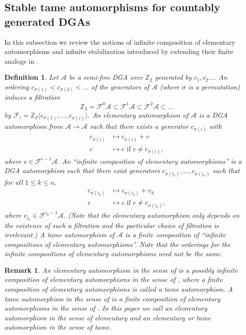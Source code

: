 \documentclass[11pt]{amsart}
\theoremstyle{mystyle}
\newtheorem{definition}{Definition}[section]
\newtheorem{remark}[remark]{Remark}
\newcommand{\Z}{\mathbb{Z}}
\newcommand{\<}{\langle}
\renewcommand{\>}{\rangle}
\begin{document}
\subsection{Stable tame automorphisms for countably generated DGAs}

In this subsection we review the notions of infinite composition of elementary automorphisms and infinite stabilization introduced by \cite[Sec. 2.6]{ekholmNg2015weinstein} extending their finite analogs in \cite[Sec. 2]{chekanov2002dga}.

\begin{definition}
    Let $\mathcal{A}$ be a semi-free DGA over $\Z_2$ generated by $c_1, c_2 \dots$. An ordering $c_{\sigma(1)} < c_{\sigma(2)} < \dots$ of the generators of $\mathcal{A}$ (where $\sigma$ is a permutation) induces a filtration \[\Z_2 = \mathcal{F}^0 \mathcal{A} \subset \mathcal{F}^1 \mathcal{A} \subset \mathcal{F}^2 \mathcal{A} \subset \dots \] by $\mathcal{F}_i = \Z_2\langle c_{\sigma(1)}, \dots, c_{\sigma(i)} \rangle$. An \textit{elementary} automorphism of $\mathcal{A}$ is a DGA automorphism from $\mathcal{A} \rightarrow \mathcal{A}$ such that there exists a generator $c_{\sigma(i)}$ with \begin{align*}
        c_{\sigma(i)} &\mapsto c_{\sigma(i)} + v \\
        c &\mapsto c \text{ if } c \neq c_{\sigma(i)},
    \end{align*} where $v \in \mathcal{F}^{i-1} \mathcal{A}$. An ``infinite composition of elementary automorphisms'' is a DGA automorphism such that there exist generators $c_{\sigma(i_1)}, \dots, c_{\sigma(i_n)}$ such that for all $1 \leq k \leq n$, \begin{align*}
        c_{\sigma(i_k)} &\mapsto c_{\sigma(i_k)} + v_k \\
        c &\mapsto c \text{ if } c \neq c_{\sigma(i_k)},
    \end{align*} where $v_{i_k} \in \mathcal{F}^{i_k-1} \mathcal{A}$. (Note that the elementary automorphism only depends on the existence of such a filtration and the particular choice of filtration is irrelevant.) A \textit{tame} automorphism of $\mathcal{A}$ is a finite composition of ``infinite compositions of elementary automorphisms''. Note that the orderings for the infinite compositions of elementary automorphisms need not be the same.
\end{definition}

\begin{remark}
    An elementary automorphism in the sense of \cite{ekholmNg2015weinstein} is a possibly infinite composition of elementary automorphisms in the sense of \cite{chekanov2002dga}, where a finite composition of elementary automorphisms is called a tame automorphism. A tame automorphism in the sense of \cite{ekholmNg2015weinstein} is a finite composition of elementary automorphisms in the sense of \cite{ekholmNg2015weinstein}. In this paper we call an elementary automorphism in the sense of \cite{chekanov2002dga} elementary and an elementary or tame automorphism in the sense of \cite{ekholmNg2015weinstein} tame.
\end{remark}
\end{document}
